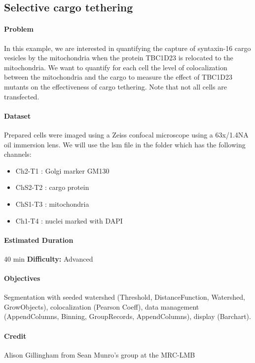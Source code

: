 \subsection{Selective cargo tethering}

\paragraph{Problem}

In this example, we are interested in quantifying the capture of syntaxin-16 cargo vesicles by the mitochondria when the protein TBC1D23 is relocated to the mitochondria. We want to quantify for each cell the level of colocalization between the mitochondria and the cargo to measure the effect of TBC1D23 mutants on the effectiveness of cargo tethering. Note that not all cells are transfected.


\paragraph{Dataset} Prepared cells were imaged using a Zeiss confocal microscope using a 63x/1.4NA oil immersion lens. We will use the lsm file in the folder  which has the following channels:

\begin{itemize}\itemsep0em
    \item Ch2-T1 : Golgi marker GM130
    \item ChS2-T2 : cargo protein
    \item ChS1-T3 : mitochondria
    \item Ch1-T4 : nuclei marked with DAPI
\end{itemize}

\paragraph{Estimated Duration} 40 min \quad \textbf{Difficulty:} Advanced

\paragraph{Objectives} Segmentation with seeded watershed (Threshold, DistanceFunction, Watershed, GrowObjects), colocalization (Pearson Coeff), data management (AppendColumns, Binning, GroupRecords, AppendColumns), display (Barchart).

\paragraph{Credit}  Alison Gillingham from Sean Munro's group at the MRC-LMB

